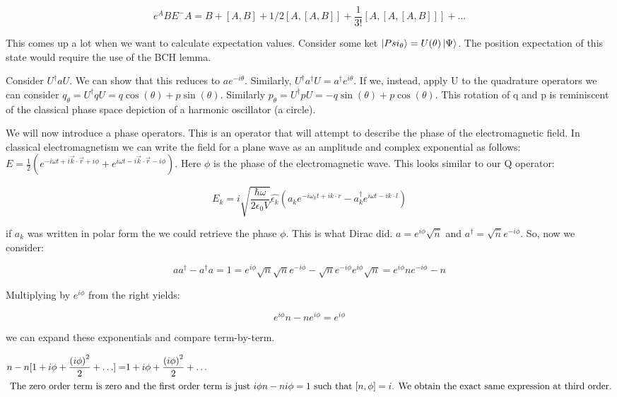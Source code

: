 \documentclass{article}
\begin{document}
\[
    e^A B E^-A = B + [A,B] + 1/2 [A,[A,B]] + \frac{1}{3!} [A,[A,[A,B]]] + ...
\]

This comes up a lot when we want to calculate expectation values. Consider some
ket $\ket{Psi_\theta} = U(\theta) \ket{\Psi}$. The position expectation of this
state would require the use of the BCH lemma.

Consider $U^\dagger a U$. We can show that this reduces to $a e^{-i \theta}$.
Similarly, $U^\dagger a^\dagger U = a^\dagger e^{i \theta}$. If we, instead,
apply U to the quadrature operators we can consider $q_\theta = U^\dagger q U =
q \cos(\theta) + p \sin(\theta)$. Similarly $p_\theta = U^\dagger p U = -q
\sin(\theta) + p\cos(\theta)$. This rotation of q and p is reminiscent of the
classical phase space depiction of a harmonic oscillator (a circle).

We will now introduce a phase operators. This is an operator that will attempt
to describe the phase of the electromagnetic field. In classical
electromagnetism we can write the field for a plane wave as an amplitude and
complex exponential as follows: $E = \frac{1}{2} \left( e^{-i \omega t + i
    \vec{k} \cdot \vec{r} + i \phi} + e^{i \omega t - i \vec{k} \cdot \vec{r} - i
\phi} \right)$. Here $\phi$ is the phase of the electromagnetic wave. This looks
similar to our Q operator:

\[ 
    E_k = i \sqrt{\frac{\hbar \omega}{2 \epsilon_0 V}} \hat{\epsilon_k} \left(
    a_k e^{-i \omega_k t + i k \cdot r} - 
    a_k^\dagger e^{i \omega t - i k \cdot l }\right)
\]

if $a_k$ was written in polar form the we could retrieve the phase $\phi$. This
is what Dirac did. $a = e^{i \phi} \sqrt{\hat{n}}$ and $a^\dagger =
\sqrt{\hat{n}} e^{-i \phi}$. So, now we consider:

\[ 
    a a^\dagger - a^\dagger a = 1 = e^{i \phi} \sqrt{n}\sqrt{n} e^{-i \phi} -
    \sqrt{n}e^{-i \phi} e^{i \phi} \sqrt{n} = e^{i \phi} n e^{-i \phi} - n  
\]

Multiplying by $e^{i\phi}$  from the right yields:

\[
    e^{i \phi} n - n e^{i\phi} = e^{i \phi}
\]

we can expand these exponentials and compare term-by-term.

\begin{align*}
    [1 + i \phi + \frac{(i\phi)^2}{2}+\ldots]n -n[1+i \phi + \frac{\left( i\phi
    \right)^2}{2} + \ldots] =& 1 + i \phi + \frac{\left( i\phi \right)^2}{2} +
        \ldots \\
        \intertext{ The zero order term is zero and the first order term is just
        $i \phi n - n i \phi = 1$ such that $[n,\phi] = i$. We obtain the exact
        same expression at third order.}
    \end{align*}
\end{document}

